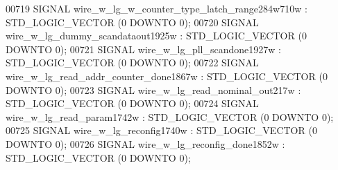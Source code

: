 \begin{DoxyCode}
{00719      \textcolor{keywordflow}{SIGNAL}  \textcolor{vhdlchar}{wire_w_lg_w_counter_type_latch_range284w710w}   \textcolor{vhdlchar}{:}   \textcolor{comment}{STD\_LOGIC\_VECTOR} \textcolor{vhdlchar}{(}\textcolor{vhdllogic}{}\textcolor{vhdllogic}{0} \textcolor{keywordflow}{DOWNTO} \textcolor{vhdllogic}{}\textcolor{vhdllogic}{0}\textcolor{vhdlchar}{)};
00720      \textcolor{keywordflow}{SIGNAL}  \textcolor{vhdlchar}{wire_w_lg_dummy_scandataout1925w}   \textcolor{vhdlchar}{:}   \textcolor{comment}{STD\_LOGIC\_VECTOR} \textcolor{vhdlchar}{(}\textcolor{vhdllogic}{}\textcolor{vhdllogic}{0} \textcolor{keywordflow}{DOWNTO} \textcolor{vhdllogic}{}\textcolor{vhdllogic}{0}\textcolor{vhdlchar}{)};
00721      \textcolor{keywordflow}{SIGNAL}  \textcolor{vhdlchar}{wire_w_lg_pll_scandone1927w}    \textcolor{vhdlchar}{:}   \textcolor{comment}{STD\_LOGIC\_VECTOR} \textcolor{vhdlchar}{(}\textcolor{vhdllogic}{}\textcolor{vhdllogic}{0} \textcolor{keywordflow}{DOWNTO} \textcolor{vhdllogic}{}\textcolor{vhdllogic}{0}\textcolor{vhdlchar}{)};
00722      \textcolor{keywordflow}{SIGNAL}  \textcolor{vhdlchar}{wire_w_lg_read_addr_counter_done1867w}  \textcolor{vhdlchar}{:}   \textcolor{comment}{STD\_LOGIC\_VECTOR} \textcolor{vhdlchar}{(}\textcolor{vhdllogic}{}\textcolor{vhdllogic}{0} \textcolor{keywordflow}{DOWNTO} \textcolor{vhdllogic}{}\textcolor{vhdllogic}{0}\textcolor{vhdlchar}{)};
00723      \textcolor{keywordflow}{SIGNAL}  \textcolor{vhdlchar}{wire_w_lg_read_nominal_out217w} \textcolor{vhdlchar}{:}   \textcolor{comment}{STD\_LOGIC\_VECTOR} \textcolor{vhdlchar}{(}\textcolor{vhdllogic}{}\textcolor{vhdllogic}{0} \textcolor{keywordflow}{DOWNTO} \textcolor{vhdllogic}{}\textcolor{vhdllogic}{0}\textcolor{vhdlchar}{)};
00724      \textcolor{keywordflow}{SIGNAL}  \textcolor{vhdlchar}{wire_w_lg_read_param1742w}  \textcolor{vhdlchar}{:}   \textcolor{comment}{STD\_LOGIC\_VECTOR} \textcolor{vhdlchar}{(}\textcolor{vhdllogic}{}\textcolor{vhdllogic}{0} \textcolor{keywordflow}{DOWNTO} \textcolor{vhdllogic}{}\textcolor{vhdllogic}{0}\textcolor{vhdlchar}{)};
00725      \textcolor{keywordflow}{SIGNAL}  \textcolor{vhdlchar}{wire_w_lg_reconfig1740w}    \textcolor{vhdlchar}{:}   \textcolor{comment}{STD\_LOGIC\_VECTOR} \textcolor{vhdlchar}{(}\textcolor{vhdllogic}{}\textcolor{vhdllogic}{0} \textcolor{keywordflow}{DOWNTO} \textcolor{vhdllogic}{}\textcolor{vhdllogic}{0}\textcolor{vhdlchar}{)};
00726      \textcolor{keywordflow}{SIGNAL}  \textcolor{vhdlchar}{wire_w_lg_reconfig_done1852w}   \textcolor{vhdlchar}{:}   \textcolor{comment}{STD\_LOGIC\_VECTOR} \textcolor{vhdlchar}{(}\textcolor{vhdllogic}{}\textcolor{vhdllogic}{0} \textcolor{keywordflow}{DOWNTO} \textcolor{vhdllogic}{}\textcolor{vhdllogic}{0}\textcolor{vhdlchar}{)};
}
\end{DoxyCode}
